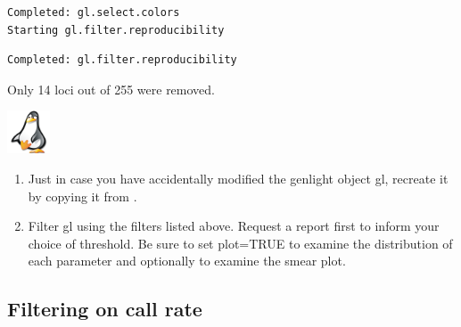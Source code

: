 \documentclass[
  letterpaper,
  DIV=11,
  numbers=noendperiod]{scrreprt}
\let\textttOrig\texttt
\renewcommand{\texttt}[1]{\textttOrig{\color{blue}{#1}}}
\begin{document}
\begin{verbatim}
Completed: gl.select.colors 
Starting gl.filter.reproducibility 
\end{verbatim}

\begin{figure}[H]

{\centering \texttt{[image: basicfiltering\_files/figure-pdf/unnamed-chunk-3-2.pdf]}

}

\end{figure}

\begin{verbatim}
Completed: gl.filter.reproducibility 
\end{verbatim}

Only 14 loci out of 255 were removed.

\begin{tcolorbox}[enhanced jigsaw, toptitle=1mm, colframe=quarto-callout-note-color-frame, title=\textcolor{quarto-callout-note-color}{\faInfo}\hspace{0.5em}{Exercise}, breakable, arc=.35mm, bottomrule=.15mm, bottomtitle=1mm, opacitybacktitle=0.6, titlerule=0mm, rightrule=.15mm, toprule=.15mm, leftrule=.75mm, coltitle=black, left=2mm, opacityback=0, colback=white, colbacktitle=quarto-callout-note-color!10!white]

\includegraphics[width=0.5in,height=0.5in]{images/task.png}

\begin{enumerate}
\def\labelenumi{\arabic{enumi}.}
\item
  Just in case you have accidentally modified the genlight object gl,
  recreate it by copying it from \texttt{testset.gl}.

  \texttt{gl\ \textless{}-\ testset.gl}
\item
  Filter gl using the filters listed above. Request a report first to
  inform your choice of threshold. Be sure to set plot=TRUE to examine
  the distribution of each parameter and optionally
  \texttt{smearplot=TRUE} to examine the smear plot.
\end{enumerate}

\end{tcolorbox}

\hypertarget{filtering-on-call-rate}{%
\subsection{Filtering on call rate}\label{filtering-on-call-rate}}
\end{document}

